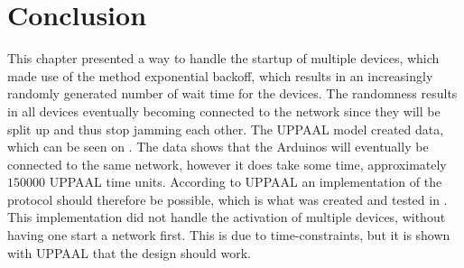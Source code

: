 \section{Conclusion}
This chapter presented a way to handle the startup of multiple devices, which made use of the method exponential backoff, which results in an increasingly randomly generated number of wait time for the devices. 
The randomness results in all devices eventually becoming connected to the network since they will be split up and thus stop jamming each other.
The UPPAAL model created data, which can be seen on .
The data shows that the Arduinos will eventually be connected to the same network, however it does take some time, approximately $150 000$ UPPAAL time units.
According to UPPAAL an implementation of the protocol should therefore be possible, which is what was created and tested in .
This implementation did not handle the activation of multiple devices, without having one start a network first. 
This is due to time-constraints, but it is shown with UPPAAL that the design should work.

